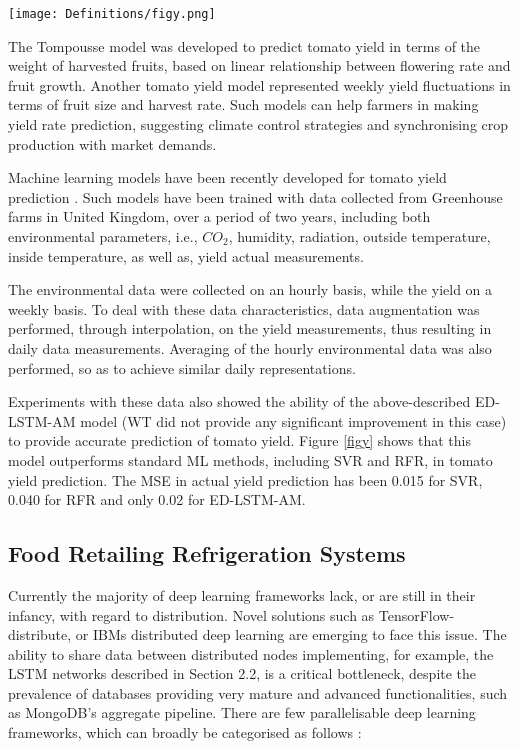 \documentclass[journal,article,accept,moreauthors,pdftex]{Definitions/mdpi}
\begin{document}
\begin{figure*}[tph!]
\texttt{[image: Definitions/figy.png]}
\centering
\caption{Performance comparison in tomato yield prediction  (by ED-LSTM-AM  and standard ML methods).}
\label{figy}
\end{figure*}

The Tompousse model \cite{ref29} was developed to predict tomato yield in terms of the weight of harvested fruits, based on linear relationship between flowering rate and fruit growth. Another tomato yield model \cite{ref30} represented weekly yield fluctuations in terms of fruit size and harvest rate. Such models \cite{ref31} can help farmers in making  yield rate prediction, suggesting climate control strategies and synchronising crop production with market demands.

Machine learning models have been recently developed for tomato yield  prediction \cite{ref45}. Such models have been trained with data collected from Greenhouse farms in United Kingdom, over a period of two years, including both environmental parameters, i.e., $CO_{2}$, humidity, radiation, outside
temperature, inside temperature, as well as, yield actual measurements. 

The environmental data were collected on an hourly basis, while the yield on a weekly basis. To deal with these data characteristics,  data augmentation was performed, through interpolation, on the yield measurements, thus  resulting in daily data measurements. Averaging of the hourly environmental data was also performed, so as to achieve similar daily representations.

Experiments with these data also showed the ability of the above-described ED-LSTM-AM model (WT did not provide any significant improvement in this case) to provide accurate prediction of tomato yield. Figure \ref{figy} shows that this model outperforms standard ML methods, including SVR and RFR, in tomato yield prediction. The MSE in actual yield prediction has been 0.015 for SVR, 0.040 for RFR and only 0.02 for ED-LSTM-AM.



\subsection{Food Retailing Refrigeration Systems}


Currently the majority of deep learning frameworks  lack, or are still in their infancy, with regard to distribution. Novel solutions such as TensorFlow-distribute, or IBMs distributed deep learning are emerging to face this issue. The ability to share data between distributed nodes implementing, for example, the LSTM networks described in Section 2.2, is a critical bottleneck, despite the prevalence of databases providing very mature and advanced functionalities, such as MongoDB’s aggregate pipeline. 
There are few parallelisable deep learning frameworks, which can broadly be categorised as follows \cite{ref32}:
\end{document}
